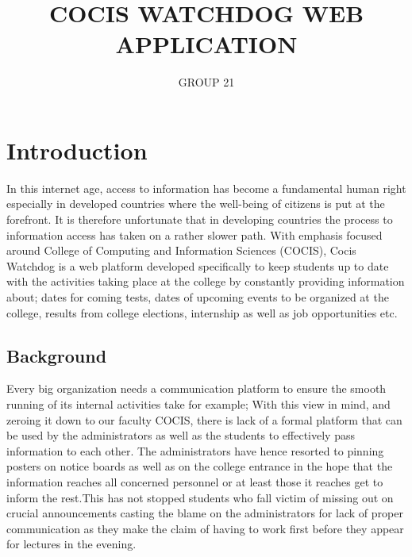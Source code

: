 \documentclass{article}
\begin{document}
\title{COCIS WATCHDOG WEB APPLICATION}
\author{GROUP 21}

\maketitle

\section{Introduction}

In this internet age, access to information has become a fundamental human right especially in developed countries where the well-being of citizens is put at the forefront. It is therefore unfortunate that in developing countries the process to information access has taken on a rather slower path. With emphasis focused around College of Computing and Information Sciences (COCIS), Cocis Watchdog is a web platform developed specifically to keep students up to date with the activities taking place at the college by constantly providing information about; dates for coming tests, dates of upcoming events to be organized at the college, results from college elections, internship as well as job opportunities etc.

\subsection{Background}
Every big organization needs a communication platform to ensure the smooth running of its internal activities take for example;
With this view in mind, and zeroing it down to our faculty COCIS, there is lack of a formal platform that can be used by the administrators as well as the students to effectively pass information to each other. The administrators have hence resorted to pinning posters on notice boards as well as on the college entrance in the hope that the information reaches all concerned personnel or at least those it reaches get to inform the rest.This has not stopped students who fall victim of missing out on crucial announcements casting the blame on the administrators for lack of proper communication as they make the claim of having to work first before they appear for lectures in the evening.
\end{document}
